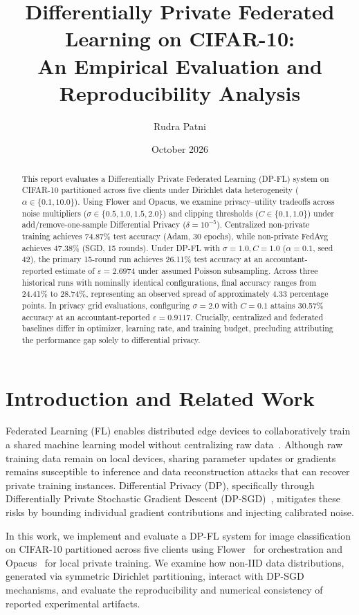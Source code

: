\documentclass[11pt,a4paper]{article}
\title{\textbf{Differentially Private Federated Learning on CIFAR-10:\\An Empirical Evaluation and Reproducibility Analysis}}
\author{Rudra Patni}
\date{October 2026}
\begin{document}
\maketitle

\begin{abstract}
This report evaluates a Differentially Private Federated Learning (DP-FL) system on CIFAR-10 partitioned across five clients under Dirichlet data heterogeneity ($\alpha \in \{0.1, 10.0\}$). Using Flower and Opacus, we examine privacy--utility tradeoffs across noise multipliers ($\sigma \in \{0.5, 1.0, 1.5, 2.0\}$) and clipping thresholds ($C \in \{0.1, 1.0\}$) under add/remove-one-sample Differential Privacy ($\delta = 10^{-5}$). Centralized non-private training achieves 74.87\% test accuracy (Adam, 30 epochs), while non-private FedAvg achieves 47.38\% (SGD, 15 rounds). Under DP-FL with $\sigma=1.0, C=1.0$ ($\alpha=0.1$, seed 42), the primary 15-round run achieves 26.11\% test accuracy at an accountant-reported estimate of $\varepsilon=2.6974$ under assumed Poisson subsampling. Across three historical runs with nominally identical configurations, final accuracy ranges from 24.41\% to 28.74\%, representing an observed spread of approximately 4.33 percentage points. In privacy grid evaluations, configuring $\sigma=2.0$ with $C=0.1$ attains 30.57\% accuracy at an accountant-reported $\varepsilon=0.9117$. Crucially, centralized and federated baselines differ in optimizer, learning rate, and training budget, precluding attributing the performance gap solely to differential privacy.
\end{abstract}

\section{Introduction and Related Work}

Federated Learning (FL) enables distributed edge devices to collaboratively train a shared machine learning model without centralizing raw data~\cite{mcmahan2017}. Although raw training data remain on local devices, sharing parameter updates or gradients remains susceptible to inference and data reconstruction attacks that can recover private training instances. Differential Privacy (DP), specifically through Differentially Private Stochastic Gradient Descent (DP-SGD)~\cite{abadi2016}, mitigates these risks by bounding individual gradient contributions and injecting calibrated noise.

In this work, we implement and evaluate a DP-FL system for image classification on CIFAR-10 partitioned across five clients using Flower~\cite{flower} for orchestration and Opacus~\cite{opacus} for local private training. We examine how non-IID data distributions, generated via symmetric Dirichlet partitioning, interact with DP-SGD mechanisms, and evaluate the reproducibility and numerical consistency of reported experimental artifacts.
\end{document}

